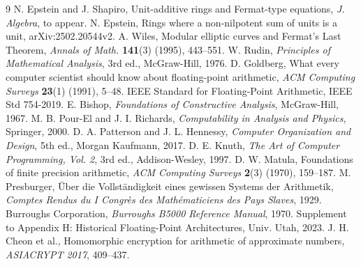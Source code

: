 \documentclass[12pt]{amsart}
\theoremstyle{break}
\begin{document}
\newpage
\begin{thebibliography}{9}
 N. Epstein and J. Shapiro, Unit-additive rings and Fermat-type equations, \textit{J. Algebra}, to appear.
 N. Epstein, Rings where a non-nilpotent sum of units is a unit, arXiv:2502.20544v2.
 A. Wiles, Modular elliptic curves and Fermat's Last Theorem, \textit{Annals of Math.} \textbf{141}(3) (1995), 443–551.
 W. Rudin, \textit{Principles of Mathematical Analysis}, 3rd ed., McGraw-Hill, 1976.
 D. Goldberg, What every computer scientist should know about floating-point arithmetic, \textit{ACM Computing Surveys} \textbf{23}(1) (1991), 5–48.
 IEEE Standard for Floating-Point Arithmetic, IEEE Std 754-2019.
 E. Bishop, \textit{Foundations of Constructive Analysis}, McGraw-Hill, 1967.
 M. B. Pour-El and J. I. Richards, \textit{Computability in Analysis and Physics}, Springer, 2000.
 D. A. Patterson and J. L. Hennessy, \textit{Computer Organization and Design}, 5th ed., Morgan Kaufmann, 2017.
 D. E. Knuth, \textit{The Art of Computer Programming, Vol. 2}, 3rd ed., Addison-Wesley, 1997.
 D. W. Matula, Foundations of finite precision arithmetic, \textit{ACM Computing Surveys} \textbf{2}(3) (1970), 159–187.
 M. Presburger, Über die Vollständigkeit eines gewissen Systems der Arithmetik, \textit{Comptes Rendus du I Congrès des Mathématiciens des Pays Slaves}, 1929.
 Burroughs Corporation, \textit{Burroughs B5000 Reference Manual}, 1970.
 Supplement to Appendix H: Historical Floating-Point Architectures, Univ. Utah, 2023.
 J. H. Cheon et al., Homomorphic encryption for arithmetic of approximate numbers, \textit{ASIACRYPT 2017}, 409–437.
\end{thebibliography}
\printindex   %
\end{document}
